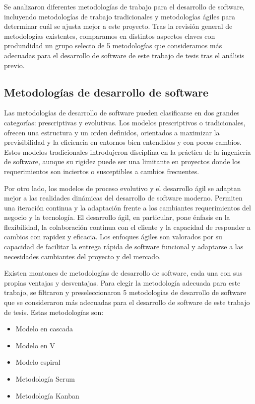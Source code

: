 \documentclass[main.tex]{subfiles}
\begin{document}
Se analizaron diferentes metodologías de trabajo para el desarrollo de software, incluyendo metodologías de trabajo tradicionales y metodologías ágiles para determinar cuál se ajusta mejor a este proyecto. Tras la revisión general de metodologías existentes, comparamos en distintos aspectos claves con produndidad un grupo selecto de 5 metodologías que consideramos más adecuadas para el desarrollo de software de este trabajo de tesis tras el análisis previo. 

\subsection{Metodologías de desarrollo de software}

Las metodologías de desarrollo de software pueden clasificarse en dos grandes categorías: prescriptivas y evolutivas. Los modelos prescriptivos o tradicionales, ofrecen una estructura y un orden definidos, orientados a maximizar la previsibilidad y la eficiencia en entornos bien entendidos y con pocos cambios. Estos modelos tradicionales introdujeron disciplina en la práctica de la ingeniería de software, aunque su rigidez puede ser una limitante en proyectos donde los requerimientos son inciertos o susceptibles a cambios frecuentes.

Por otro lado, los modelos de proceso evolutivo y el desarrollo ágil se adaptan mejor a las realidades dinámicas del desarrollo de software moderno. Permiten una iteración continua y la adaptación frente a los cambiantes requerimientos del negocio y la tecnología. El desarrollo ágil, en particular, pone énfasis en la flexibilidad, la colaboración continua con el cliente y la capacidad de responder a cambios con rapidez y eficacia. Los enfoques ágiles son valorados por su capacidad de facilitar la entrega rápida de software funcional y adaptarse a las necesidades cambiantes del proyecto y del mercado.

Existen montones de metodologías de desarrollo de software, cada una con sus propias ventajas y desventajas. Para elegir la metodología adecuada para este trabajo, se filtraron y preseleccionaron 5 metodologías de desarrollo de software que se consideraron más adecuadas para el desarrollo de software de este trabajo de tesis. Estas metodologías son:

\begin{itemize}
		\item Modelo en cascada
		\item Modelo en V
		\item Modelo espiral
		\item Metodología Scrum
		\item Metodología Kanban
\end{itemize}
\end{document}
